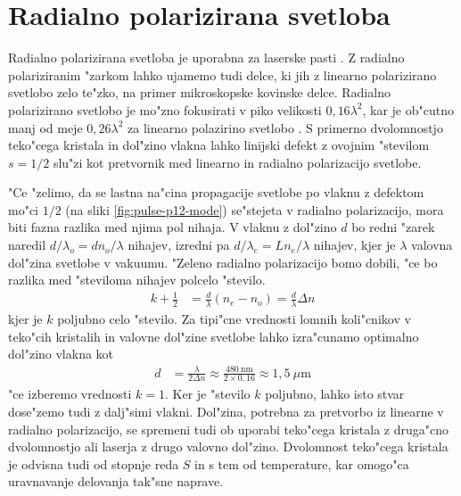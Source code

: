 \documentclass[12pt,twoside,openright,final,a4paper]{report}
\begin{document}
\section{Radialno polarizirana svetloba}
Radialno polarizirana svetloba je uporabna za laserske pasti \cite{radial-trap}.
Z radialno polariziranim "zarkom lahko ujamemo tudi delce, ki jih z linearno polarizirano svetlobo zelo te"zko, na primer mikroskopske kovinske delce.
Radialno polarizirano svetlobo je mo"zno fokusirati v piko velikosti $0,\!16\lambda^2$, kar je ob"cutno manj od meje $0,\!26\lambda^2$ za linearno polazirino svetlobo \cite{radial-focus, kozawa-sato-focal-spot}. 
S primerno dvolomnostjo teko"cega kristala in dol"zino vlakna lahko linijski defekt z ovojnim "stevilom $s=1/2$ slu"zi kot pretvornik med linearno in radialno polarizacijo svetlobe. 

"Ce "zelimo, da se lastna na"cina propagacije svetlobe po vlaknu z defektom mo"ci $1/2$ (na sliki \ref{fig:pulse-p12-mode}) se"stejeta v radialno polarizacijo, mora biti fazna razlika med njima pol nihaja. 
V vlaknu z dol"zino $d$ bo redni "zarek naredil $d/\lambda_o = d n_o/\lambda$ nihajev, izredni pa $d/\lambda_e = Ln_e/\lambda$ nihajev, kjer je $\lambda$ valovna dol"zina svetlobe v vakuumu. 
"Zeleno radialno polarizacijo bomo dobili, "ce bo razlika med "steviloma nihajev polcelo "stevilo. 
\begin{align}
  k + \frac{1}{2} &= \frac{d}{\lambda} \left( n_e - n_o \right) = \frac{d}{\lambda} \Delta n
\end{align}
kjer je $k$ poljubno celo "stevilo. Za tipi"cne vrednosti lomnih koli"cnikov v teko"cih kristalih in valovne dol"zine svetlobe lahko izra"cunamo optimalno dol"zino vlakna kot
\begin{align}
 d &= \frac{\lambda}{2\Delta n} \approx \frac{480~\mathrm{nm}}{2 \times 0,\!16} \approx 1,\!5~\mu\mathrm{m}
\end{align}
"ce izberemo vrednosti $k=1$. Ker je "stevilo $k$ poljubno, lahko isto stvar dose"zemo tudi z dalj"simi vlakni. 
Dol"zina, potrebna za pretvorbo iz linearne v radialno polarizacijo, se spremeni tudi ob uporabi teko"cega kristala z druga"cno dvolomnostjo ali laserja z drugo valovno dol"zino. 
Dvolomnost teko"cega kristala je odvisna tudi od stopnje reda $S$ in s tem od temperature, kar omogo"ca uravnavanje delovanja tak"sne naprave. 
\end{document}

